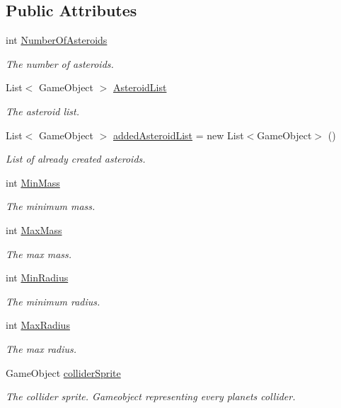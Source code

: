 \subsection*{Public Attributes}
\begin{DoxyCompactItemize}
\item 
int \mbox{\hyperlink{class_asteroid_generator_a4cc51b71a8eb59ad4fa0a58b1ab2fdbc}{Number\+Of\+Asteroids}}
\begin{DoxyCompactList}\small\item\em The number of asteroids. \end{DoxyCompactList}\item 
List$<$ Game\+Object $>$ \mbox{\hyperlink{class_asteroid_generator_a96adffc17fece791d1735c8ffd72cd43}{Asteroid\+List}}
\begin{DoxyCompactList}\small\item\em The asteroid list. \end{DoxyCompactList}\item 
List$<$ Game\+Object $>$ \mbox{\hyperlink{class_asteroid_generator_a3547304e3d1a3777f6d996e7f6c409de}{added\+Asteroid\+List}} = new List$<$Game\+Object$>$ ()
\begin{DoxyCompactList}\small\item\em List of already created asteroids. \end{DoxyCompactList}\item 
int \mbox{\hyperlink{class_asteroid_generator_ac4789385fb5a11f27cf743ddf1e32f93}{Min\+Mass}}
\begin{DoxyCompactList}\small\item\em The minimum mass. \end{DoxyCompactList}\item 
int \mbox{\hyperlink{class_asteroid_generator_aaa0eb57c660f14898c0c7b196293584a}{Max\+Mass}}
\begin{DoxyCompactList}\small\item\em The max mass. \end{DoxyCompactList}\item 
int \mbox{\hyperlink{class_asteroid_generator_a7bbc470dbc92203ced647f45cf557940}{Min\+Radius}}
\begin{DoxyCompactList}\small\item\em The minimum radius. \end{DoxyCompactList}\item 
int \mbox{\hyperlink{class_asteroid_generator_a5e008980325a1f5b6faa04a8b44fdc3e}{Max\+Radius}}
\begin{DoxyCompactList}\small\item\em The max radius. \end{DoxyCompactList}\item 
Game\+Object \mbox{\hyperlink{class_asteroid_generator_ab4e16ac73ae5fc15af5704ad3e6f8bc5}{collider\+Sprite}}
\begin{DoxyCompactList}\small\item\em The collider sprite. Gameobject representing every planet\textquotesingle{}s collider. \end{DoxyCompactList}\end{DoxyCompactItemize}


